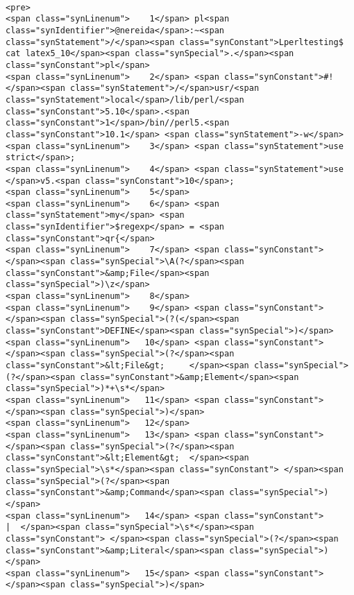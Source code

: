 \begin{verbatim}

<pre>
<span class="synLinenum">    1</span> pl<span class="synIdentifier">@nereida</span>:~<span class="synStatement">/</span><span class="synConstant">Lperltesting$ cat latex5_10</span><span class="synSpecial">.</span><span class="synConstant">pl</span>
<span class="synLinenum">    2</span> <span class="synConstant">#!</span><span class="synStatement">/</span>usr/<span class="synStatement">local</span>/lib/perl/<span class="synConstant">5.10</span>.<span class="synConstant">1</span>/bin//perl5.<span class="synConstant">10.1</span> <span class="synStatement">-w</span>
<span class="synLinenum">    3</span> <span class="synStatement">use strict</span>;
<span class="synLinenum">    4</span> <span class="synStatement">use </span>v5.<span class="synConstant">10</span>;
<span class="synLinenum">    5</span> 
<span class="synLinenum">    6</span> <span class="synStatement">my</span> <span class="synIdentifier">$regexp</span> = <span class="synConstant">qr{</span>
<span class="synLinenum">    7</span> <span class="synConstant">    </span><span class="synSpecial">\A(?</span><span class="synConstant">&amp;File</span><span class="synSpecial">)\z</span>
<span class="synLinenum">    8</span> 
<span class="synLinenum">    9</span> <span class="synConstant">    </span><span class="synSpecial">(?(</span><span class="synConstant">DEFINE</span><span class="synSpecial">)</span>
<span class="synLinenum">   10</span> <span class="synConstant">        </span><span class="synSpecial">(?</span><span class="synConstant">&lt;File&gt;     </span><span class="synSpecial">(?</span><span class="synConstant">&amp;Element</span><span class="synSpecial">)*+\s*</span>
<span class="synLinenum">   11</span> <span class="synConstant">        </span><span class="synSpecial">)</span>
<span class="synLinenum">   12</span> 
<span class="synLinenum">   13</span> <span class="synConstant">        </span><span class="synSpecial">(?</span><span class="synConstant">&lt;Element&gt;  </span><span class="synSpecial">\s*</span><span class="synConstant"> </span><span class="synSpecial">(?</span><span class="synConstant">&amp;Command</span><span class="synSpecial">)</span>
<span class="synLinenum">   14</span> <span class="synConstant">                  |  </span><span class="synSpecial">\s*</span><span class="synConstant"> </span><span class="synSpecial">(?</span><span class="synConstant">&amp;Literal</span><span class="synSpecial">)</span>
<span class="synLinenum">   15</span> <span class="synConstant">        </span><span class="synSpecial">)</span>

\end{verbatim}

